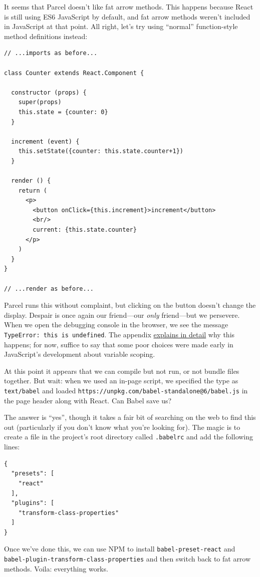 It seems that Parcel doesn't like fat arrow methods. This happens
because React is still using ES6 JavaScript by default, and fat arrow
methods weren't included in JavaScript at that point. All right, let's
try using ``normal'' function-style method definitions instead:

\begin{verbatim}
// ...imports as before...

class Counter extends React.Component {

  constructor (props) {
    super(props)
    this.state = {counter: 0}
  }

  increment (event) {
    this.setState({counter: this.state.counter+1})
  }

  render () {
    return (
      <p>
        <button onClick={this.increment}>increment</button>
        <br/>
        current: {this.state.counter}
      </p>
    )
  }
}

// ...render as before...
\end{verbatim}

Parcel runs this without complaint, but clicking on the button doesn't
change the display. Despair is once again our friend---our \emph{only}
friend---but we persevere. When we open the debugging console in the
browser, we see the message \texttt{TypeError:\ this\ is\ undefined}.
The appendix \protect\hyperlink{s:legacy-prototypes}{explains in detail}
why this happens; for now, suffice to say that some poor choices were
made early in JavaScript's development about variable scoping.

At this point it appears that we can compile but not run, or not bundle
files together. But wait: when we used an in-page script, we specified
the type as \texttt{text/babel} and loaded
\texttt{https://unpkg.com/babel-standalone@6/babel.js} in the page
header along with React. Can Babel save us?

The answer is ``yes'', though it takes a fair bit of searching on the
web to find this out (particularly if you don't know what you're looking
for). The magic is to create a file in the project's root directory
called \texttt{.babelrc} and add the following lines:

\begin{verbatim}
{
  "presets": [
    "react"
  ],
  "plugins": [
    "transform-class-properties"
  ]
}
\end{verbatim}

Once we've done this, we can use NPM to install
\texttt{babel-preset-react} and
\texttt{babel-plugin-transform-class-properties} and then switch back to
fat arrow methods. Voila: everything works.

